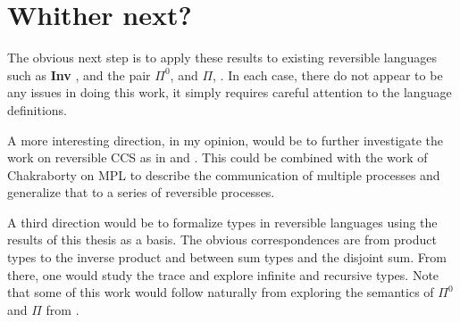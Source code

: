 \section{Whither next?}
\label{sec:whither-next}

The obvious next step is to apply these results to existing reversible languages such as
\textbf{Inv} \cite{muetal04:injreversible}, and the pair $\Pi^0$, \cite{james2013isomorphic} and $\Pi$,
\cite{james2012information}. In each case, there do not appear to be any issues in doing this work,
it simply requires careful attention to the language definitions.

A more interesting direction, in my opinion, would be to further investigate the work on reversible
CCS as in \cite{danos2004reversible} and \cite{phillips2006operational}. This could be combined with
the work of Chakraborty on MPL \cite{chakraborty2014} to describe the communication of multiple
processes and generalize that to a series of reversible processes.

A third direction would be to formalize types in reversible languages using the results of this
thesis as a basis. The obvious correspondences are from product types to the inverse product and
between sum types and the disjoint sum. From there, one would study the trace and explore infinite
and recursive types. Note that some of this work would follow naturally from exploring the semantics
of $\Pi^0$ and $\Pi$ from \cite{james2013isomorphic,james2012information}.



